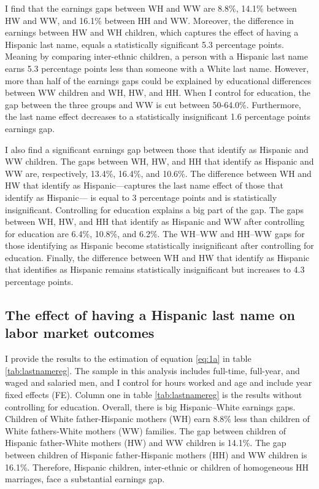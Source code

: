 \documentclass[12pt, fullpage]{article}
\begin{document}
I find that the earnings gaps between WH and WW are 8.8\%, 14.1\% between HW and WW, and 16.1\% between HH and WW. Moreover, the difference in earnings between HW and WH children, which captures the effect of having a Hispanic last name, equals a statistically significant 5.3 percentage points. Meaning by comparing inter-ethnic children, a person with a Hispanic last name earns 5.3 percentage points less than someone with a White last name. However, more than half of the earnings gaps could be explained by educational differences between WW children and WH, HW, and HH. When I control for education, the gap between the three groups and WW is cut between 50-64.0\%. Furthermore, the last name effect decreases to a statistically insignificant 1.6 percentage points earnings gap.

I also find a significant earnings gap between those that identify as Hispanic and WW children. The gaps between WH, HW, and HH that identify as Hispanic and WW are, respectively, 13.4\%, 16.4\%, and 10.6\%. The difference between WH and HW that identify as Hispanic---captures the last name effect of those that identify as Hispanic--- is equal to 3 percentage points and is statistically insignificant. Controlling for education explains a big part of the gap. The gaps between WH, HW, and HH that identify as Hispanic and WW after controlling for education are 6.4\%, 10.8\%, and 6.2\%. The WH--WW and HH--WW gaps for those identifying as Hispanic become statistically insignificant after controlling for education. Finally, the difference between WH and HW that identify as Hispanic that identifies as Hispanic remains statistically insignificant but increases to 4.3 percentage points.

\subsection{The effect of having a Hispanic last name on labor market outcomes}

I provide the results to the estimation of equation \ref{eq:1a} in table \ref{tab:lastnamereg}. The sample in this analysis includes full-time, full-year, and waged and salaried men, and I control for hours worked and age and include year fixed effects (FE). Column one in table \ref{tab:lastnamereg} is the results without controlling for education. Overall, there is big Hispanic--White earnings gaps. Children of White father-Hispanic mothers (WH) earn 8.8\% less than children of White fathers-White mothers (WW) families. The gap between children of Hispanic father-White mothers (HW) and WW children is 14.1\%. The gap between children of Hispanic father-Hispanic mothers (HH) and WW children is 16.1\%. Therefore, Hispanic children, inter-ethnic or children of homogeneous HH marriages, face a substantial earnings gap.
\end{document}
